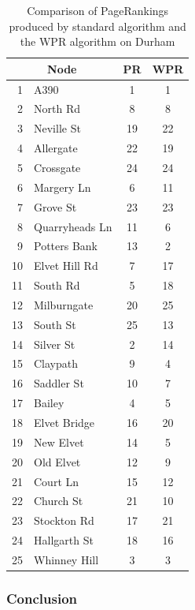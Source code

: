 \begin{table}[h] \caption{Comparison of PageRankings produced by standard algorithm and the WPR algorithm on Durham}
 \centering
 \begin{tabular} {r l| c c} 
 \multicolumn{2}{c|}{Node}& PR & WPR \\ [0.5ex] 
 \hline
 1&A390&1&1\\
 2&North Rd&8&8\\
 3&Neville St&19&22\\
 4&Allergate&22&19\\
 5&Crossgate&24&24\\
 6&Margery Ln&6&11\\
 7&Grove St&23&23\\
 8&Quarryheads Ln&11&6\\
 9&Potters Bank&13&2\\
 10&Elvet Hill Rd&7&17\\
 11&South Rd&5&18\\
 12&Milburngate&20&25\\
 13&South St&25&13\\
 14&Silver St&2&14\\
 15&Claypath&9&4\\
 16&Saddler St&10&7\\
 17&Bailey&4&5\\
 18&Elvet Bridge&16&20\\
 19&New Elvet&14&5\\
 20&Old Elvet&12&9\\
 21&Court Ln&15&12\\
 22&Church St&21&10\\
 23&Stockton Rd&17&21\\
 24&Hallgarth St&18&16\\
 25&Whinney Hill&3&3\\
 
 \end{tabular}
 \label{Table:Durham comparison}
\end{table}
\FloatBarrier

\subsubsection{Conclusion} \label{sec:Durham conc}